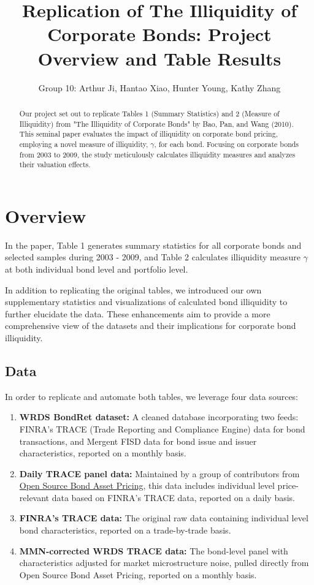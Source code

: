 \documentclass{article}
\title{Replication of The Illiquidity of Corporate Bonds: Project Overview and Table Results}
\author{Group 10: Arthur Ji, Hantao Xiao, Hunter Young, Kathy Zhang}
\begin{document}
\maketitle

\begin{abstract}
Our project set out to replicate Tables 1 (Summary Statistics) and 2 (Measure of Illiquidity) from "The Illiquidity of Corporate Bonds" by Bao, Pan, and Wang (2010). This seminal paper evaluates the impact of illiquidity on corporate bond pricing, employing a novel measure of illiquidity, $\gamma$, for each bond. Focusing on corporate bonds from 2003 to 2009, the study meticulously calculates illiquidity measures and analyzes their valuation effects.
\end{abstract}

\section{Overview}

In the paper, Table 1 generates summary statistics for all corporate bonds and selected samples during 2003 - 2009, and Table 2 calculates illiquidity measure $\gamma$ at both individual bond level and portfolio level. 

In addition to replicating the original tables, we introduced our own supplementary statistics and visualizations of calculated bond illiquidity to further elucidate the data. These enhancements aim to provide a more comprehensive view of the datasets and their implications for corporate bond illiquidity. 

\subsection{Data}

In order to replicate and automate both tables, we leverage four data sources:

\begin{enumerate}
  \item \textbf{WRDS BondRet dataset:} A cleaned database incorporating two feeds: FINRA’s TRACE (Trade Reporting and Compliance Engine) data for bond transactions, and Mergent FISD data for bond issue and issuer characteristics, reported on a monthly basis.
  
  \item \textbf{Daily TRACE panel data:} Maintained by a group of contributors from \href{https://openbondassetpricing.com/}{Open Source Bond Asset Pricing}, this data includes individual level price-relevant data based on FINRA’s TRACE data, reported on a daily basis.
  
  \item \textbf{FINRA’s TRACE data:} The original raw data containing individual level bond characteristics, reported on a trade-by-trade basis.
  
  \item \textbf{MMN-corrected WRDS TRACE data:} The bond-level panel with characteristics adjusted for market microstructure noise, pulled directly from Open Source Bond Asset Pricing, reported on a monthly basis.
\end{enumerate}
\end{document}
